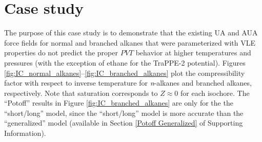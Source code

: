 \documentclass[preprint,letterpaper,floatfix,citeautoscript,aip,jcp]{revtex4-1}
\begin{document}

\section{Case study} \label{Case Study}

The purpose of this case study is to demonstrate that the existing UA and AUA force fields for normal and branched alkanes that were parameterized with VLE properties do not predict the proper $PVT$ behavior at higher temperatures and pressures (with the exception of ethane for the TraPPE-2 potential). Figures \ref{fig:IC_normal_alkanes}--\ref{fig:IC_branched_alkanes} plot the compressibility factor with respect to inverse temperature for \textit{n}-alkanes and branched alkanes, respectively. Note that saturation corresponds to $Z \approx 0$ for each isochore. The ``Potoff'' results in Figure \ref{fig:IC_branched_alkanes} are only for the the ``short/long'' model, since the ``short/long'' model is more accurate than the ``generalized'' model (available in Section \ref{Potoff Generalized} of Supporting Information). 
\end{document}
